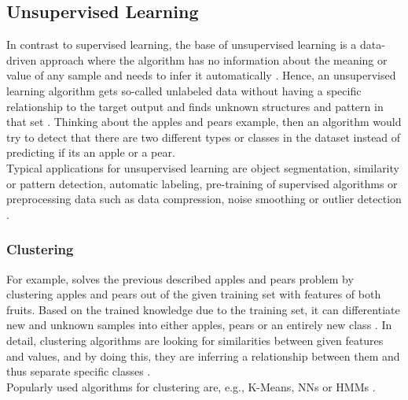 \documentclass[MGS,Master,english]{twbook}%
\begin{document}
\subsection{Unsupervised Learning} \label{ML::unsupervisedLearning}
In contrast to supervised learning, the base of unsupervised learning is a data-driven approach where the algorithm has no information about the meaning or value of any sample and needs to infer it automatically \cite{ml::book::developer}. Hence, an unsupervised learning algorithm gets so-called unlabeled data without having a specific relationship to the target output and finds unknown structures and pattern in that set \cite{ai::book}. Thinking about the apples and pears example, then an algorithm would try to detect that there are two different types or classes in the dataset instead of predicting if its an apple or a pear.\\
Typical applications for unsupervised learning are object segmentation, similarity or pattern detection, automatic labeling, pre-training of supervised algorithms or preprocessing data such as data compression, noise smoothing or outlier detection \cite{ml::book::algorithms} \cite{ai::book}.

\subsubsection{Clustering}
For example, solves the previous described apples and pears problem by clustering apples and pears out of the given training set with features of both fruits. Based on the trained knowledge due to the training set, it can differentiate new and unknown samples into either apples, pears or an entirely new class \cite{ai::book}. In detail, clustering algorithms are looking for similarities between given features and values, and by doing this, they are inferring a relationship between them and thus separate specific classes \cite{ml::book::developer}.\\
Popularly used algorithms for clustering are, e.g., K-Means, \acp{NN} or \acp{HMM}  \cite{ml::book::developer}.
\end{document}
